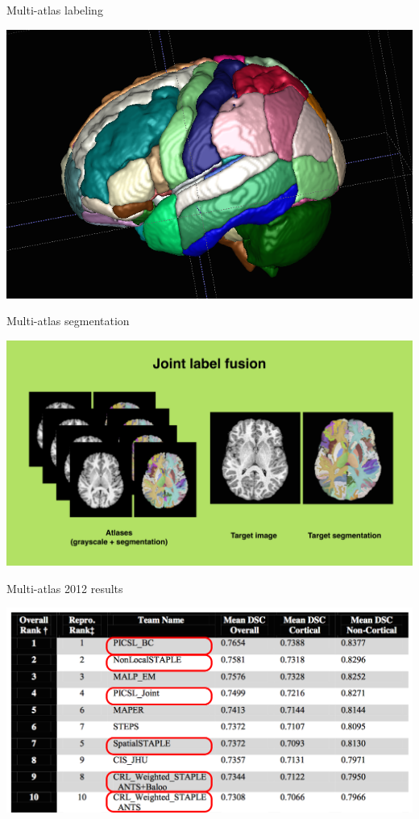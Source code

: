 \documentclass[ignorenonframetext,]{beamer}
\begin{document}
\begin{frame}{Multi-atlas labeling}

\includegraphics{./competitions/figures/NKI30_MALF.png}

\end{frame}

\begin{frame}{Multi-atlas segmentation}

\includegraphics{./tools/jointfusion/figures/jointLabelFusion.png}

\end{frame}

\begin{frame}{Multi-atlas 2012 results}

\includegraphics{./competitions/figures/MALF2012.png}

\end{frame}
\end{document}
